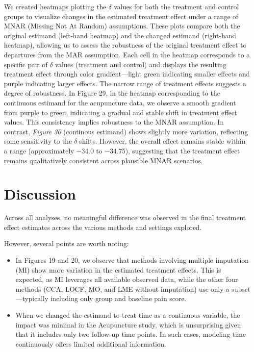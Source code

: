 \documentclass{article}
\begin{document}
We created heatmaps plotting the \(\delta\) values for both the
treatment and control groups to visualize changes in the estimated
treatment effect under a range of MNAR (Missing Not At Random)
assumptions. These plots compare both the original estimand (left-hand
heatmap) and the changed estimand (right-hand heatmap), allowing us to
assess the robustness of the original treatment effect to departures
from the MAR assumption. Each cell in the heatmap corresponds to a
specific pair of \(\delta\) values (treatment and control) and displays
the resulting treatment effect through color gradient---light green
indicating smaller effects and purple indicating larger effects. The
narrow range of treatment effects suggests a degree of robustness. In
Figure 29, in the heatmap corresponding to the continuous estimand for
the acupuncture data, we observe a smooth gradient from purple to green,
indicating a gradual and stable shift in treatment effect values. This
consistency implies robustness to the MNAR assumption. In contrast,
\emph{Figure 30} (continous estimand) shows slightly more variation,
reflecting some sensitivity to the \(\delta\) shifts. However, the
overall effect remains stable within a range (approximately −34.0 to
−34.75), suggesting that the treatment effect remains qualitatively
consistent across plausible MNAR scenarios.

\section{Discussion}\label{discussion}

Across all analyses, no meaningful difference was observed in the final
treatment effect estimates across the various methods and settings
explored.

However, several points are worth noting:

\begin{itemize}
\item
  In Figures 19 and 20, we observe that methods involving multiple
  imputation (MI) show more variation in the estimated treatment
  effects. This is expected, as MI leverages all available observed
  data, while the other four methods (CCA, LOCF, MO, and LME without
  imputation) use only a subset---typically including only group and
  baseline pain score.
\item
  When we changed the estimand to treat time as a continuous variable,
  the impact was minimal in the Acupuncture study, which is unsurprising
  given that it includes only two follow-up time points. In such cases,
  modeling time continuously offers limited additional information.
\end{itemize}
\end{document}
